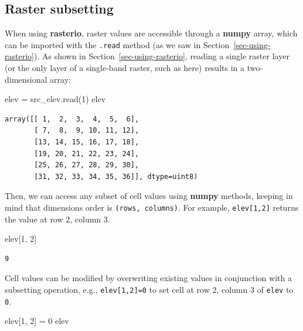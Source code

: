 \documentclass[
  letterpaper,
]{krantz}
\newenvironment{Shaded}{\begin{snugshade}}{\end{snugshade}}
\newcommand{\DecValTok}[1]{\textcolor[rgb]{0.68,0.00,0.00}{#1}}
\newcommand{\NormalTok}[1]{\textcolor[rgb]{0.00,0.23,0.31}{#1}}
\newcommand{\OperatorTok}[1]{\textcolor[rgb]{0.37,0.37,0.37}{#1}}
\begin{document}
\subsection{Raster subsetting}\label{sec-raster-subsetting}

When using \textbf{rasterio}, raster values are accessible through a
\textbf{numpy} array, which can be imported with the \texttt{.read}
method (as we saw in Section~\ref{sec-using-rasterio}). As shown in
Section~\ref{sec-using-rasterio}, reading a single raster layer (or the
only layer of a single-band raster, such as here) results in a
two-dimensional array:

\begin{Shaded}
\begin{Highlighting}[]
\NormalTok{elev }\OperatorTok{=}\NormalTok{ src\_elev.read(}\DecValTok{1}\NormalTok{)}
\NormalTok{elev}
\end{Highlighting}
\end{Shaded}

\begin{verbatim}
array([[ 1,  2,  3,  4,  5,  6],
       [ 7,  8,  9, 10, 11, 12],
       [13, 14, 15, 16, 17, 18],
       [19, 20, 21, 22, 23, 24],
       [25, 26, 27, 28, 29, 30],
       [31, 32, 33, 34, 35, 36]], dtype=uint8)
\end{verbatim}

Then, we can access any subset of cell values using \textbf{numpy}
methods, keeping in mind that dimensions order is
\texttt{(rows,\ columns)}. For example, \texttt{elev{[}1,2{]}} returns
the value at row 2, column 3.

\begin{Shaded}
\begin{Highlighting}[]
\NormalTok{elev[}\DecValTok{1}\NormalTok{, }\DecValTok{2}\NormalTok{]}
\end{Highlighting}
\end{Shaded}

\begin{verbatim}
9
\end{verbatim}

Cell values can be modified by overwriting existing values in
conjunction with a subsetting operation, e.g., \texttt{elev{[}1,2{]}=0}
to set cell at row 2, column 3 of \texttt{elev} to \texttt{0}.

\begin{Shaded}
\begin{Highlighting}[]
\NormalTok{elev[}\DecValTok{1}\NormalTok{, }\DecValTok{2}\NormalTok{] }\OperatorTok{=} \DecValTok{0}
\NormalTok{elev}
\end{Highlighting}
\end{Shaded}
\end{document}
